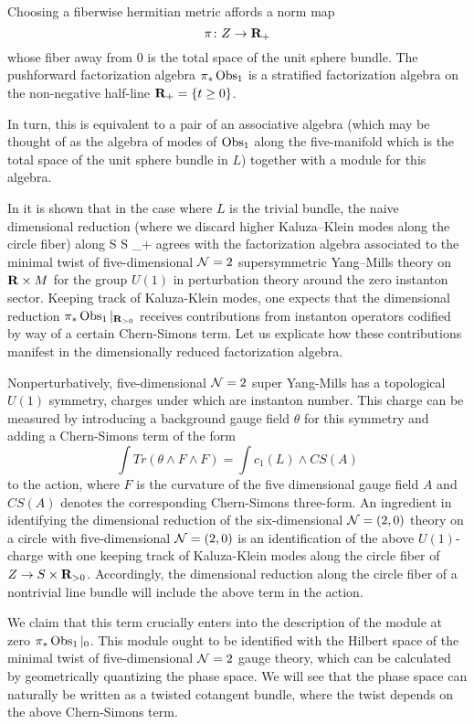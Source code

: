 Choosing a fiberwise hermitian metric affords a norm map 
\[
\pi \colon Z \to \mathbf{R}_{+}
\] 
whose fiber away from $0$ is the total space of the unit sphere bundle.
The pushforward factorization algebra $\pi_{*}\operatorname{Obs}_{1}$ is a stratified factorization algebra on the non-negative half-line $\mathbf{R}_+ = \{t \geq 0\}$. 

In turn, this is equivalent to a pair of an associative algebra (which may be thought of as the algebra of modes of $\operatorname{Obs}_{1}$ along the five-manifold which is the total space of the unit sphere bundle in $L$) together with a module for this algebra.

In \cite{SWtensor} it is shown that in the case where $L$ is the trivial bundle, the naive dimensional reduction (where we discard higher Kaluza--Klein modes along the circle fiber) along 
\beqn
S \times \C \to S \times \R_+
\eeqn
agrees with the factorization algebra associated to the minimal twist of five-dimensional $\mathcal N = 2$ supersymmetric Yang--Mills theory on $\mathbf{R}\times M$ for the group $U(1)$ in perturbation theory around the zero instanton sector. Keeping track of Kaluza-Klein modes, one expects that the dimensional reduction $\pi_{*}\operatorname{Obs}_{1}|_{\mathbf{R}_{>0}}$ receives contributions from instanton operators codified by way of a certain Chern-Simons term. Let us explicate how these contributions manifest in the dimensionally reduced factorization algebra.

Nonperturbatively, five-dimensional $\mathcal N=2$ super Yang-Mills has a topological $U(1)$ symmetry, charges under which are instanton number. This charge can be measured by introducing a background gauge field $\theta$ for this symmetry and adding a Chern-Simons term of the form 
\[
\int Tr (\theta\wedge F\wedge F) = \int c_1 (L) \wedge CS (A)
\]
 to the action, where $F$ is the curvature of the five dimensional gauge field $A$ and $CS(A)$ denotes the corresponding Chern-Simons three-form. An ingredient in identifying the dimensional reduction of the six-dimensional $\mathcal N=(2,0)$ theory on a circle with five-dimensional $\mathcal N= (2,0)$ is an identification of the above $U(1)$-charge with one keeping track of Kaluza-Klein modes along the circle fiber of $Z \to S\times \mathbf{R}_{>0}$. Accordingly, the dimensional reduction along the circle fiber of a nontrivial line bundle will include the above term in the action.

We claim that this term crucially enters into the description of the module at zero $\pi_{*}\operatorname{Obs}_{1}|_{0}$. This module ought to be identified with the Hilbert space of the minimal twist of five-dimensional $\mathcal N = 2$ gauge theory, which can be calculated by geometrically quantizing the phase space. We will see that the phase space can naturally be written as a twisted cotangent bundle, where the twist depends on the above Chern-Simons term.

